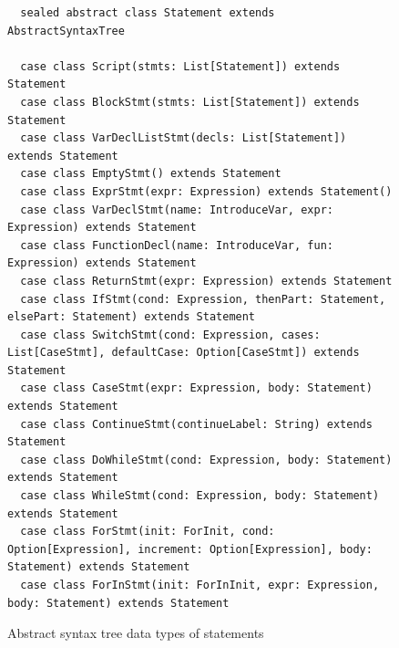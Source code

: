 \documentclass{article}
\begin{document}
\begin{figure}
{}
\begin{lstlisting}
  sealed abstract class Statement extends AbstractSyntaxTree

  case class Script(stmts: List[Statement]) extends  Statement
  case class BlockStmt(stmts: List[Statement]) extends Statement
  case class VarDeclListStmt(decls: List[Statement]) extends Statement
  case class EmptyStmt() extends Statement
  case class ExprStmt(expr: Expression) extends Statement()
  case class VarDeclStmt(name: IntroduceVar, expr: Expression) extends Statement
  case class FunctionDecl(name: IntroduceVar, fun: Expression) extends Statement
  case class ReturnStmt(expr: Expression) extends Statement
  case class IfStmt(cond: Expression, thenPart: Statement, elsePart: Statement) extends Statement
  case class SwitchStmt(cond: Expression, cases: List[CaseStmt], defaultCase: Option[CaseStmt]) extends Statement
  case class CaseStmt(expr: Expression, body: Statement) extends Statement
  case class ContinueStmt(continueLabel: String) extends Statement
  case class DoWhileStmt(cond: Expression, body: Statement) extends Statement
  case class WhileStmt(cond: Expression, body: Statement) extends Statement
  case class ForStmt(init: ForInit, cond: Option[Expression], increment: Option[Expression], body: Statement) extends Statement
  case class ForInStmt(init: ForInInit, expr: Expression, body: Statement) extends Statement

\end{lstlisting}
\caption{Abstract syntax tree data types of statements}
\label{fig:js-stmt}
\end{figure}
\end{document}
